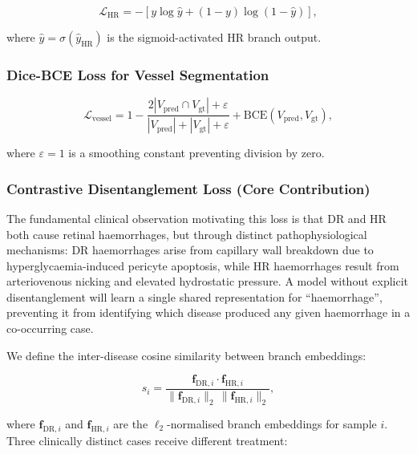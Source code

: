 \documentclass[review,12pt]{elsarticle}
\begin{document}
\begin{equation}
  \mathcal{L}_{\text{HR}} = -\left[y \log \hat{y} + (1-y)\log(1-\hat{y})\right],
  \label{eq:bce}
\end{equation}

where $\hat{y} = \sigma(\hat{y}_{\text{HR}})$ is the sigmoid-activated HR
branch output.

\subsubsection{Dice-BCE Loss for Vessel Segmentation}

\begin{equation}
  \mathcal{L}_{\text{vessel}} = 1 - \frac{2|V_{\text{pred}} \cap V_{\text{gt}}|
  + \varepsilon}{|V_{\text{pred}}| + |V_{\text{gt}}| + \varepsilon}
  + \text{BCE}(V_{\text{pred}}, V_{\text{gt}}),
  \label{eq:vessel}
\end{equation}

where $\varepsilon = 1$ is a smoothing constant preventing division by zero.

\subsubsection{Contrastive Disentanglement Loss (Core Contribution)}

The fundamental clinical observation motivating this loss is that DR and HR
both cause retinal haemorrhages, but through distinct pathophysiological
mechanisms: DR haemorrhages arise from capillary wall breakdown due to
hyperglycaemia-induced pericyte apoptosis, while HR haemorrhages result from
arteriovenous nicking and elevated hydrostatic pressure. A model without
explicit disentanglement will learn a single shared representation for
``haemorrhage'', preventing it from identifying which disease produced any
given haemorrhage in a co-occurring case.

We define the inter-disease cosine similarity between branch embeddings:

\begin{equation}
  s_i = \frac{\mathbf{f}_{\text{DR},i} \cdot \mathbf{f}_{\text{HR},i}}
  {\|\mathbf{f}_{\text{DR},i}\|_2 \, \|\mathbf{f}_{\text{HR},i}\|_2},
  \label{eq:cosine}
\end{equation}

where $\mathbf{f}_{\text{DR},i}$ and $\mathbf{f}_{\text{HR},i}$ are the
$\ell_2$-normalised branch embeddings for sample $i$. Three clinically
distinct cases receive different treatment:
\end{document}
